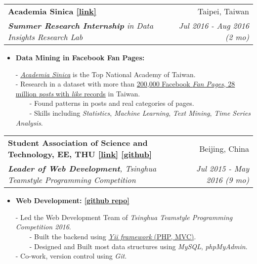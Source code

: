 \documentclass[letterpaper,11pt]{article}
\makeatletter
\newcommand{\resumeItem}[2]{
  \item\small{
    \textbf{#1}{ #2 \vspace{-2pt}}
  }
}
\newcommand{\resumeSubheading}[4]{
  \vspace{-1pt}\item
    \begin{tabular*}{0.97\textwidth}{l@{\extracolsep{\fill}}r}
      \textbf{#1} & #2 \\
      \textit{\small#3} & \textit{\small #4} \\
    \end{tabular*}\vspace{-5pt}
}
\newcommand{\resumeItemListStart}{\begin{itemize}}
\newcommand{\resumeItemListEnd}{\end{itemize}\vspace{-5pt}}
\makeatother
\begin{document}
    \resumeSubheading
      {Academia Sinica \color{blue}\href{http://mmnet.iis.sinica.edu.tw}{[link]}}{Taipei, Taiwan}
      {\textbf{Summer Research Internship} in Data Insights Research Lab}{Jul 2016 - Aug 2016 (2 mo)}
      \resumeItemListStart
        \resumeItem{Data Mining in Facebook Fan Pages: }\\
        \vspace{1mm}
          {- \href{https://www.sinica.edu.tw/ch}{\emph{Academia Sinica}} is the Top National Academy of Taiwan.}\\
          {- Research in a dataset with more than \underline{200,000 Facebook \emph{Fan Pages}, 28 million \emph{posts} with \emph{like} records} in Taiwan.}\\
          {~~~~- Found patterns in posts and real categories of pages.}\\
          {~~~~- Skills including \emph{Statistics}, \emph{Machine Learning}, \emph{Text Mining}, \emph{Time Series Analysis}.}

      \resumeItemListEnd

    \resumeSubheading
      {Student Association of Science and Technology, EE, THU
      \color{blue}\href{http://www.eesast.com}{[link]}
      \color{blue}\href{https://github.com/eesast}{[github]}
      }
      {Beijing, China}
      {\textbf{Leader of Web Development}, Tsinghua Teamstyle Programming Competition}{Jul 2015 - May 2016 (9 mo)}
      \resumeItemListStart
        \resumeItem{Web Development: \color{blue}\href{http://github.com/eesast/ts17web}{\textbf{[github repo]}}}\\
        \vspace{1mm}
          {- Led the Web Development Team of \emph{Tsinghua Teamstyle Programming Competition 2016}.}\\
          {~~~~- Built the backend using \href{http://www.yiiframework.com}{\emph{Yii framework} (PHP, MVC)}.}\\
          {~~~~- Designed and Built most data structures using \emph{MySQL}, \emph{phpMyAdmin}.}\\
          {- Co-work, version control using \emph{Git}. }
      \resumeItemListEnd
\end{document}
